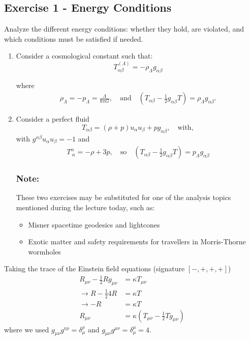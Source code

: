 \documentclass[10pt,a4paper]{article}
\theoremstyle{definition}
\begin{document}
\subsection*{Exercise 1 - Energy Conditions}
{\color{blue}

Analyze the different energy conditions: whether they hold, are violated, and which conditions must be satisfied if needed.

\begin{enumerate}
\item Consider a cosmological constant such that:
\begin{equation}
T^{(\Lambda)}_{\alpha\beta} = -\rho_\Lambda g_{\alpha\beta} \tag{1.1}
\end{equation}

where
\begin{align*}
\rho_\Lambda=-p_\Lambda = \frac{\Lambda}{8\pi G}, \quad \text{and} \quad \left(T_{\alpha\beta} - \frac{1}{2}g_{\alpha\beta}T\right) = \rho_\Lambda g_{\alpha\beta}.
\end{align*}


\item Consider a perfect fluid
\begin{equation}
T_{\alpha\beta} = (\rho + p)u_\alpha u_\beta + p g_{\alpha\beta}, \quad \text{with},\tag{1.2}
\end{equation}
with $g^{\alpha\beta} u_\alpha u_\beta = -1$ and
\begin{align*}
T^{\alpha}_{\ \alpha} = -\rho + 3p, \quad \text{so} \quad \left(T_{\alpha\beta} - \frac{1}{2}g_{\alpha\beta}T\right) = p_\Lambda g_{\alpha\beta}
\end{align*}


\subsubsection*{Note:}

These two exercises may be substituted for one of the analysis topics mentioned during the lecture today, such as:

\begin{itemize}
  \item Misner spacetime geodesics and lightcones
  \item Exotic matter and safety requirements for travellers in Morris-Thorne wormholes
\end{itemize}
\end{enumerate}
}

Taking the trace of the Einstein field equations (signature $[-,+,+,+]$)
\begin{align}
R_{\mu\nu}-\frac{1}{2}Rg_{\mu\nu}&=\kappa T_{\mu\nu}\\
\rightarrow R-\frac{1}{2}4R&=\kappa T\\
\rightarrow -R&=\kappa T\\
R_{\mu\nu}&=\kappa\left(T_{\mu\nu}-\frac{1}{2}Tg_{\mu\nu}\right)
\end{align}
where we used $g_{\mu\nu}g^{\nu\rho}=\delta^\rho_\mu$ and $g_{\mu\nu}g^{\mu\nu}=\delta^\mu_\mu=4$.
\end{document}
